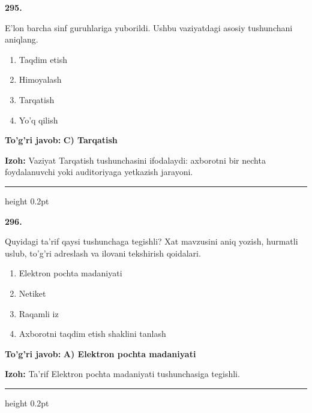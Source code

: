 \documentclass[10pt,a4paper,oneside]{article}
\begin{document}
\noindent\textbf{\color{ink}295.}
\par
E'lon barcha sinf guruhlariga yuborildi. Ushbu vaziyatdagi asosiy tushunchani aniqlang.
\begin{enumerate}[label=\Alph*),leftmargin=9mm]
\item Taqdim etish
\item Himoyalash
\item Tarqatish
\item Yo'q qilish
\end{enumerate}
\begin{tcolorbox}[enhanced,breakable,colback=teal!4,colframe=teal!50!black,boxrule=0.5pt,arc=1.1mm,left=3mm,right=3mm,top=1.7mm,bottom=1.7mm,before skip=2mm,after skip=2mm]
\textbf{\color{teal}To'g'ri javob:} \textbf{C) Tarqatish}
\par\smallskip
\textbf{Izoh:} Vaziyat Tarqatish tushunchasini ifodalaydi: axborotni bir nechta foydalanuvchi yoki auditoriyaga yetkazish jarayoni.
\end{tcolorbox}
\vspace{2mm}\hrule height 0.2pt \vspace{3mm}

\noindent\textbf{\color{ink}296.}
\par
Quyidagi ta'rif qaysi tushunchaga tegishli? Xat mavzusini aniq yozish, hurmatli uslub, to'g'ri adreslash va ilovani tekshirish qoidalari.
\begin{enumerate}[label=\Alph*),leftmargin=9mm]
\item Elektron pochta madaniyati
\item Netiket
\item Raqamli iz
\item Axborotni taqdim etish shaklini tanlash
\end{enumerate}
\begin{tcolorbox}[enhanced,breakable,colback=teal!4,colframe=teal!50!black,boxrule=0.5pt,arc=1.1mm,left=3mm,right=3mm,top=1.7mm,bottom=1.7mm,before skip=2mm,after skip=2mm]
\textbf{\color{teal}To'g'ri javob:} \textbf{A) Elektron pochta madaniyati}
\par\smallskip
\textbf{Izoh:} Ta'rif Elektron pochta madaniyati tushunchasiga tegishli.
\end{tcolorbox}
\vspace{2mm}\hrule height 0.2pt \vspace{3mm}
\end{document}
